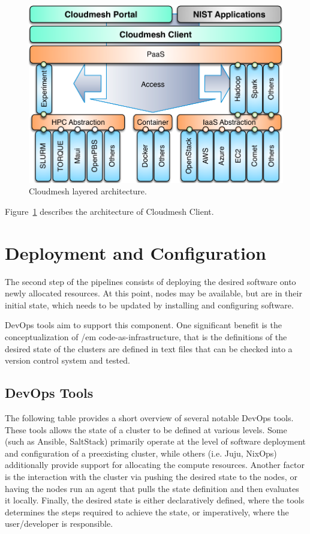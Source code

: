 \documentclass[9pt,twocolumn,twoside]{styles/osajnl}
\begin{document}
\begin{figure}[htb]
  \centering
     \includegraphics[width=1.0\columnwidth]{images/cloudmesh-arch-1.pdf}
  \caption{Cloudmesh layered architecture.} 
  \label{F:cloudmesh-arch}
\end{figure}


Figure~\ref{F:cloudmesh-arch} describes the architecture of Cloudmesh Client.

\section{Deployment and Configuration}

The second step of the pipelines consists of deploying the desired
software onto newly allocated resources. At this point, nodes may be
available, but are in their initial state, which needs to be updated
by installing and configuring software.


DevOps tools aim to support this component. One significant benefit is
the conceptualization of {/em code-as-infrastructure}, that is the
definitions of the desired state of the clusters are defined in text
files that can be checked into a version control system and tested.

\subsection{DevOps Tools}

The following table provides a short overview of several notable
DevOps tools. These tools allows the state of a cluster to be defined
at various levels. Some (such as Ansible, SaltStack) primarily operate
at the level of software deployment and configuration of a preexisting
cluster, while others (i.e. Juju, NixOps) additionally provide support
for allocating the compute resources. Another factor is the
interaction with the cluster via pushing the desired state to the
nodes, or having the nodes run an agent that pulls the state
definition and then evaluates it locally. Finally, the desired state
is either declaratively defined, where the tools determines the steps
required to achieve the state, or imperatively, where the
user/developer is responsible.
\end{document}
